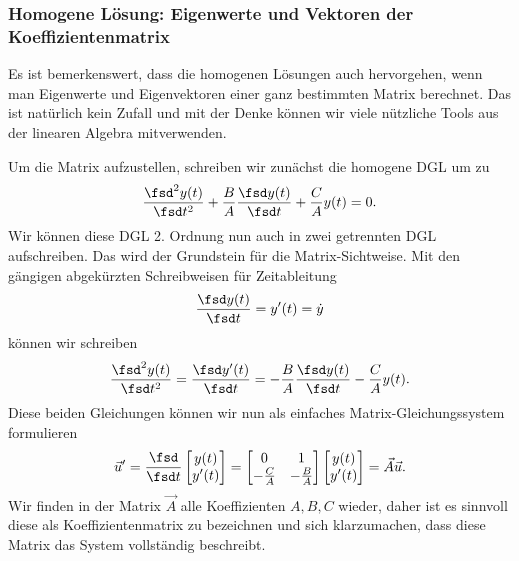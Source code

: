 \subsubsection{Homogene Lösung: Eigenwerte und Vektoren der Koeffizientenmatrix}
%
Es ist bemerkenswert, dass die homogenen Lösungen
auch hervorgehen, wenn man Eigenwerte und Eigenvektoren einer ganz bestimmten Matrix
berechnet. Das ist natürlich kein Zufall und mit der Denke können wir viele
nützliche Tools aus der linearen Algebra mitverwenden.

Um die Matrix aufzustellen, schreiben wir zunächst die homogene DGL um zu
\begin{align}
\frac{\fsd^2 y(t)}{\fsd t^2} + \frac{B}{A} \frac{\fsd y(t)}{\fsd t} + \frac{C}{A} y(t) = 0.
\end{align}
%
Wir können diese DGL 2. Ordnung nun auch in zwei getrennten DGL aufschreiben. Das wird
der Grundstein für die Matrix-Sichtweise.
%
Mit den gängigen abgekürzten Schreibweisen für Zeitableitung
\begin{align}
\frac{\fsd y(t)}{\fsd t} = y'(t) = \dot{y}
\end{align}
können wir schreiben
\begin{align}
\frac{\fsd^2 y(t)}{\fsd t^2} = \frac{\fsd y'(t)}{\fsd t} = - \frac{B}{A}  \frac{\fsd y(t)}{\fsd t} - \frac{C}{A}  y(t).
\end{align}
%
Diese beiden Gleichungen können wir nun als einfaches Matrix-Gleichungssystem formulieren
\begin{align}
\label{eq:A7BEE9E24E_uAU}
\vec{u}' = \frac{\fsd}{\fsd t}
\begin{bmatrix}
y(t) \\ y'(t)
\end{bmatrix}
=
\begin{bmatrix}
0 & 1 \\ - \frac{C}{A} & - \frac{B}{A}
\end{bmatrix}
\begin{bmatrix}
y(t) \\ y'(t)
\end{bmatrix}
=
\vec{A} \vec{u}.
\end{align}
%
Wir finden in der Matrix $\vec{A}$ alle Koeffizienten $A,B,C$ wieder, daher
ist es sinnvoll diese als Koeffizientenmatrix zu bezeichnen und sich klarzumachen,
dass diese Matrix das System vollständig beschreibt.

